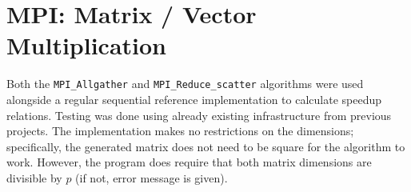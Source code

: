\documentclass[11pt]{article}
\begin{document}
\section{MPI: Matrix / Vector Multiplication}
Both the \verb=MPI_Allgather= and \verb=MPI_Reduce_scatter= algorithms were used alongside a regular sequential reference implementation to calculate speedup relations. Testing was done using already existing infrastructure from previous projects. The implementation makes no restrictions on the dimensions; specifically, the generated matrix does not need to be square for the algorithm to work. However, the program does require that both matrix dimensions are divisible by $p$ (if not, error message is given).
\end{document}
